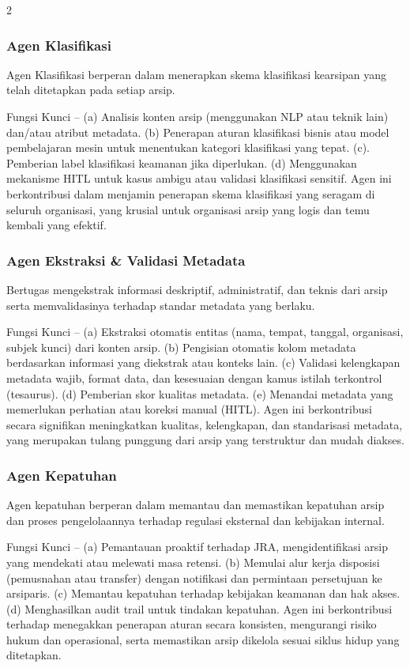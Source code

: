\documentclass[12pt,a4paper]{article}
\begin{document}
\begin{multicols}{2}
\subsubsection{Agen Klasifikasi}

Agen Klasifikasi berperan dalam menerapkan skema klasifikasi kearsipan yang telah ditetapkan pada setiap arsip.

Fungsi Kunci -- (a) Analisis konten arsip (menggunakan NLP atau teknik lain) dan/atau atribut metadata. (b) Penerapan aturan klasifikasi bisnis atau model pembelajaran mesin untuk menentukan kategori klasifikasi yang tepat. (c). Pemberian label klasifikasi keamanan jika diperlukan. (d) Menggunakan mekanisme HITL untuk kasus ambigu atau validasi klasifikasi sensitif. Agen ini berkontribusi dalam menjamin penerapan skema klasifikasi yang seragam di seluruh organisasi, yang krusial untuk organisasi arsip yang logis dan temu kembali yang efektif.

\subsubsection{Agen Ekstraksi \& Validasi Metadata}

Bertugas mengekstrak informasi deskriptif, administratif, dan teknis dari arsip serta memvalidasinya terhadap standar metadata yang berlaku.

Fungsi Kunci -- (a) Ekstraksi otomatis entitas (nama, tempat, tanggal, organisasi, subjek kunci) dari konten arsip. (b) Pengisian otomatis kolom metadata berdasarkan informasi yang diekstrak atau konteks lain. (c) Validasi kelengkapan metadata wajib, format data, dan kesesuaian dengan kamus istilah terkontrol (tesaurus). (d) Pemberian skor kualitas metadata. (e) Menandai metadata yang memerlukan perhatian atau koreksi manual (HITL). Agen ini berkontribusi secara signifikan meningkatkan kualitas, kelengkapan, dan standarisasi metadata, yang merupakan tulang punggung dari arsip yang terstruktur dan mudah diakses.

\subsubsection{Agen Kepatuhan}

Agen kepatuhan berperan dalam memantau dan memastikan kepatuhan arsip dan proses pengelolaannya terhadap regulasi eksternal dan kebijakan internal.

Fungsi Kunci -- (a) Pemantauan proaktif terhadap JRA, mengidentifikasi arsip yang mendekati atau melewati masa retensi. (b) Memulai alur kerja disposisi (pemusnahan atau transfer) dengan notifikasi dan permintaan persetujuan ke arsiparis. (c) Memantau kepatuhan terhadap kebijakan keamanan dan hak akses. (d) Menghasilkan audit trail untuk tindakan kepatuhan. Agen ini berkontribusi terhadap menegakkan penerapan aturan secara konsisten, mengurangi risiko hukum dan operasional, serta memastikan arsip dikelola sesuai siklus hidup yang ditetapkan.


\end{multicols}
\end{document}
